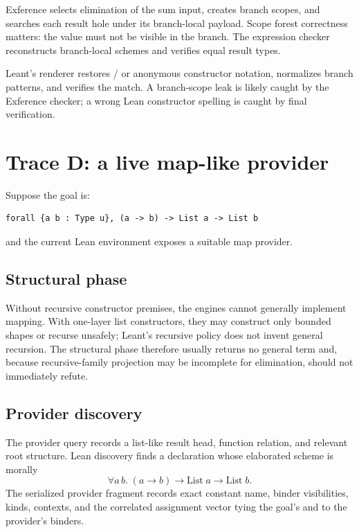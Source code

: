 \documentclass[10pt,letterpaper,oneside]{report}
\newcommand{\code}[1]{\texttt{\detokenize{#1}}}
\begin{document}
Exference selects elimination of the sum input, creates branch scopes, and searches each result hole under its branch-local payload. Scope forest correctness matters: the \code{a} value must not be visible in the \code{b} branch. The expression checker reconstructs branch-local schemes and verifies equal result types.

Leant's renderer restores \code{Sum.inl}/\code{Sum.inr} or anonymous constructor notation, normalizes branch patterns, and verifies the match. A branch-scope leak is likely caught by the Exference checker; a wrong Lean constructor spelling is caught by final verification.

\section{Trace D: a live map-like provider}\label{sec:trace-provider}

Suppose the goal is:

\begin{lstlisting}[language=Leanish]
forall {a b : Type u}, (a -> b) -> List a -> List b
\end{lstlisting}

and the current Lean environment exposes a suitable map provider.

\subsection{Structural phase}

Without recursive constructor premises, the engines cannot generally implement mapping. With one-layer list constructors, they may construct only bounded shapes or recurse unsafely; Leant's recursive policy does not invent general recursion. The structural phase therefore usually returns no general term and, because recursive-family projection may be incomplete for elimination, should not immediately refute.

\subsection{Provider discovery}

The provider query records a list-like result head, function relation, and relevant root structure. Lean discovery finds a declaration whose elaborated scheme is morally
\[
  \forall a\,b.\;(a \to b) \to \mathrm{List}\;a \to \mathrm{List}\;b.
\]
The serialized provider fragment records exact constant name, binder visibilities, kinds, contexts, and the correlated assignment vector tying the goal's \code{a} and \code{b} to the provider's binders.
\end{document}
